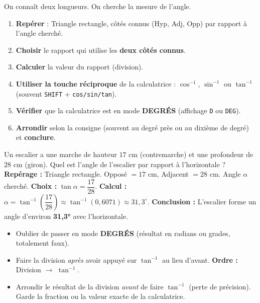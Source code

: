 \documentclass[11pt]{article}
\begin{document}
On connaît deux longueurs. On cherche la mesure de l'angle.

\begin{methode}
\begin{enumerate}
\item \textbf{Repérer} : Triangle rectangle, côtés connus (Hyp, Adj, Opp) par rapport à l'angle cherché.
\item \textbf{Choisir} le rapport qui utilise les \textbf{deux côtés connus}.
\item \textbf{Calculer} la valeur du rapport (division).
\item \textbf{Utiliser la touche réciproque} de la calculatrice : $\cos^{-1}$, $\sin^{-1}$ ou $\tan^{-1}$ (souvent \texttt{SHIFT} + \texttt{cos/sin/tan}).
\item \textbf{Vérifier} que la calculatrice est en mode \textbf{DEGRÉS} (affichage \texttt{D} ou \texttt{DEG}).
\item \textbf{Arrondir} selon la consigne (souvent au degré près ou au dixième de degré) et \textbf{conclure}.
\end{enumerate}
\end{methode}

\begin{exoresolu}
Un escalier a une marche de hauteur $17$ cm (contremarche) et une profondeur de $28$ cm (giron). Quel est l'angle de l'escalier par rapport à l'horizontale ?
\tcblower
\textbf{Repérage :} Triangle rectangle. Opposé $= 17$ cm, Adjacent $= 28$ cm. Angle $\alpha$ cherché.
\textbf{Choix :} $\tan \alpha = \dfrac{17}{28}$.
\textbf{Calcul :} $\alpha = \tan^{-1}\left(\dfrac{17}{28}\right) \approx \tan^{-1}(0{,}6071) \approx 31{,}3^{\circ}$.
\textbf{Conclusion :} L'escalier forme un angle d'environ \textbf{31,3°} avec l'horizontale.
\end{exoresolu}

\begin{attention}
\begin{itemize}
\item Oublier de passer en mode \textbf{DEGRÉS} (résultat en radians ou grades, totalement faux).
\item Faire la division \emph{après} avoir appuyé sur $\tan^{-1}$ au lieu d'avant. \textbf{Ordre :} Division $\to$ $\tan^{-1}$.
\item Arrondir le résultat de la division \emph{avant} de faire $\tan^{-1}$ (perte de précision). Garde la fraction ou la valeur exacte de la calculatrice.
\end{itemize}
\end{attention}
\end{document}
